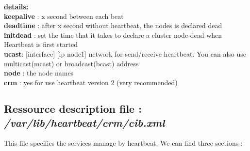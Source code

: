 \documentclass[a4paper,10pt]{report}
\begin{document}
\textbf{\underline{details:}}\\
\textbf{keepalive} : x second between each beat\\
\textbf{deadtime} : after x second without heartbeat, the nodes is declared dead\\
\textbf{initdead} : set the time that it takes to declare a cluster node dead when Heartbeat is first started\\
\textbf{ucast}: [interface] [ip node1] network for send/receive heartbeat. You can also use multicast(mcast) or broadcast(bcast) address\\
\textbf{node} : the node names\\
\textbf{crm} : yes for use heartbeat version 2 (very recommended)\\


\subsection{Ressource description file : \textit{/var/lib/heartbeat/crm/cib.xml}}
This file specifies the services manage by heartbeat. We can find three sections :
\end{document}
